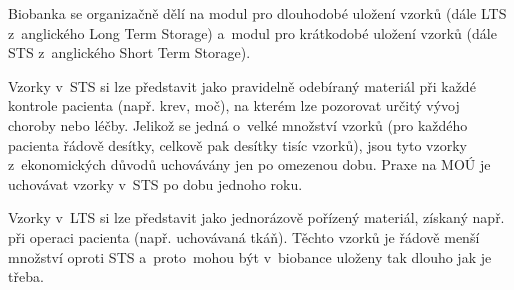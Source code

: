 \documentclass[11pt, draft, oneside]{fithesis2}
\begin{document}
Biobanka se organizačně dělí na modul pro dlouhodobé uložení vzorků (dále LTS z~anglického Long Term Storage) a~modul pro krátkodobé uložení vzorků (dále STS z~anglického Short Term Storage). 

Vzorky v~STS si lze představit jako pravidelně odebíraný materiál při každé kontrole pacienta (např. krev, moč), na kterém lze pozorovat určitý vývoj choroby nebo léčby. Jelikož se jedná o~velké množství vzorků (pro každého pacienta řádově desítky, celkově pak desítky tisíc vzorků), jsou tyto vzorky z~ekonomických důvodů uchovávány jen po omezenou dobu. Praxe na MOÚ je uchovávat vzorky v~STS po dobu jednoho roku.

Vzorky v~LTS si lze představit jako jednorázově pořízený materiál, získaný např. při operaci pacienta (např. uchovávaná tkáň). 
Těchto vzorků je řádově menší množství oproti STS a~proto~mohou být v~biobance uloženy tak dlouho jak je třeba.
\end{document}
